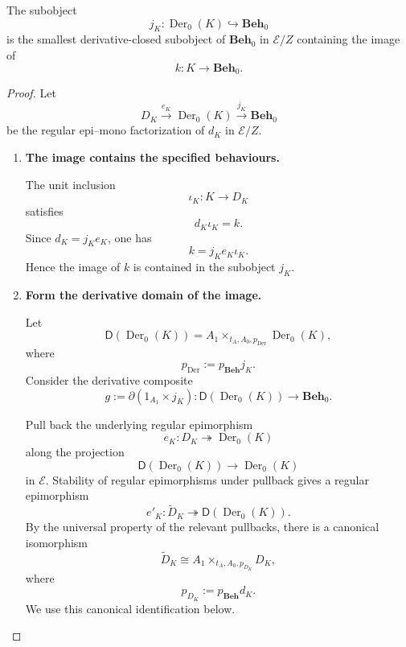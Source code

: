 \begin{theorem}
\label{thm:derivative-closure}
    The subobject
    \[
        j_K:\operatorname{Der}_0(K)\hookrightarrow\mathbf{Beh}_0
    \]
    is the smallest derivative-closed subobject of \(\mathbf{Beh}_0\) in
    \(\mathcal E/Z\) containing the image of
    \[
        k:K\to\mathbf{Beh}_0.
    \]
\end{theorem}
\begin{proof}
    Let
    \[
        D_K
            \xrightarrow{e_K}
        \operatorname{Der}_0(K)
            \xrightarrow{j_K}
        \mathbf{Beh}_0
    \]
    be the regular epi--mono factorization of \(d_K\) in \(\mathcal E/Z\).

    \begin{enumerate}
        \item \textbf{The image contains the specified behaviours.}

        The unit inclusion
        \[
            \iota_K:K\to D_K
        \]
        satisfies
        \[
            d_K\iota_K=k.
        \]
        Since \(d_K=j_Ke_K\), one has
        \[
            k=j_Ke_K\iota_K.
        \]
        Hence the image of \(k\) is contained in the subobject \(j_K\).

        \item \textbf{Form the derivative domain of the image.}

        Let
        \[
            \mathsf D(\operatorname{Der}_0(K))
            =
            A_1
            \times_{t_A,A_0,p_{\operatorname{Der}}}
            \operatorname{Der}_0(K),
        \]
        where
        \[
            p_{\operatorname{Der}}
            :=
            p_{\mathbf{Beh}}j_K.
        \]
        Consider the derivative composite
        \[
            g
            :=
            \partial(1_{A_1}\times j_K):
            \mathsf D(\operatorname{Der}_0(K))
            \to
            \mathbf{Beh}_0.
        \]

        Pull back the underlying regular epimorphism
        \[
            e_K:D_K\twoheadrightarrow\operatorname{Der}_0(K)
        \]
        along the projection
        \[
            \mathsf D(\operatorname{Der}_0(K))
            \to
            \operatorname{Der}_0(K)
        \]
        in \(\mathcal E\). Stability of regular epimorphisms under pullback
        gives a regular epimorphism
        \[
            e'_K:
            \widetilde D_K
            \twoheadrightarrow
            \mathsf D(\operatorname{Der}_0(K)).
        \]
        By the universal property of the relevant pullbacks, there is a
        canonical isomorphism
        \[
            \widetilde D_K
            \cong
            A_1\times_{t_A,A_0,p_{D_K}}D_K,
        \]
        where
        \[
            p_{D_K}:=p_{\mathbf{Beh}}d_K.
        \]
        We use this canonical identification below.


\end{enumerate}
\end{proof}
